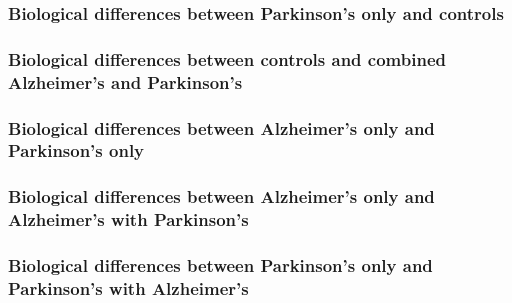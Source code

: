 \subsubsection{Biological differences between Parkinson's only and controls}
\label{subsubsec:biol-diff-betw-1}

\subsubsection{Biological differences between controls and combined Alzheimer's and Parkinson's}
\label{subsubsec:biol-diff-betw-2}

\subsubsection{Biological differences between Alzheimer's only and Parkinson's only}
\label{subsubsec:biol-diff-betw-3}

\subsubsection{Biological differences between Alzheimer's only and Alzheimer's with Parkinson's}
\label{subsubsec:biol-diff-betw-4}

\subsubsection{Biological differences between Parkinson's only and Parkinson's with Alzheimer's}
\label{subsubsec:biol-diff-betw-5}

\pagebreak






